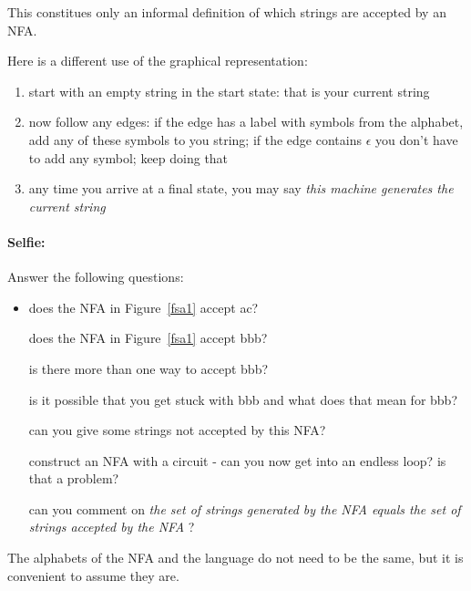 This constitues only an informal definition of which strings are
accepted by an NFA.

Here is a different use of the graphical representation:

\begin{enumerate}
\item start with an empty string in the start state: that is your
  current string
\item now follow any edges: if the edge has a label with symbols from
  the alphabet, add any of these symbols to you string; if the edge
  contains $\epsilon$ you don't have to add any symbol; keep doing that
\item any time you arrive at a final state, you may say {\em this machine generates the current string}
\end{enumerate}



\paragraph{Selfie:} Answer the following questions:

\begin{itemize}
\item[]
does the NFA in Figure~\ref{fsa1} accept ac?

does the NFA in Figure~\ref{fsa1} accept bbb?

is there more than one way to accept bbb?

is it possible that you get stuck with bbb and what does that mean for bbb?

can you give some strings not accepted by this NFA?

construct an NFA with a circuit - can you now get into an endless
loop? is that a problem?

can you comment on {\em the set of strings generated by the NFA equals
  the set of strings accepted by the NFA} ?
\end{itemize}



The alphabets of the NFA and the language do not need to be the same,
but it is convenient to assume they are.

